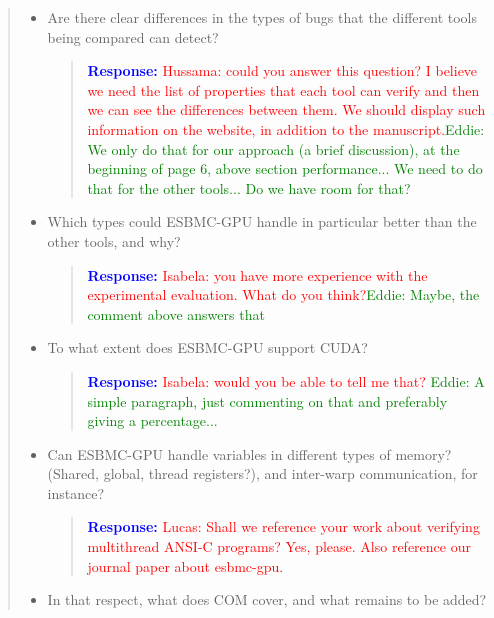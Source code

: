 \documentclass[11pt]{article}
\begin{document}
\begin{quote}
  \begin{itemize}
  \item Are there clear differences in the types of bugs that the different tools being compared can detect?
  
  \begin{quote}
  \textcolor{blue}{\textbf{Response:} \textcolor{red}{Hussama: could you answer this question? I believe we need the list of properties that each tool can verify and then we can see the differences between them. We should display such information on the website, in addition to the manuscript.}\textcolor{green}{Eddie: We only do that for our approach (a brief discussion), at the beginning of page 6, above section performance... We need to do that for the other tools... Do we have room for that?}}
  \end{quote}
  
  \item Which types could ESBMC-GPU handle in particular better than the other tools, and why?
  
  \begin{quote}
  \textcolor{blue}{\textbf{Response:} \textcolor{red}{Isabela: you have more experience with the experimental evaluation. What do you think?}\textcolor{green}{Eddie: Maybe, the comment above answers that}}
  \end{quote}
  
  \item To what extent does ESBMC-GPU support CUDA?
  
  \begin{quote}
  \textcolor{blue}{\textbf{Response:} \textcolor{red}{Isabela: would you be able to tell me that?} \textcolor{green}{Eddie: A simple paragraph, just commenting on that and preferably giving a percentage...}}
  \end{quote}
  
  \item Can ESBMC-GPU handle variables in different types of memory? (Shared, global, thread registers?), and inter-warp communication, for instance? 
  
  \begin{quote}
  \textcolor{blue}{\textbf{Response:} \textcolor{red}{Lucas: Shall we reference your work about verifying multithread ANSI-C programs? Yes, please. Also reference our journal paper about esbmc-gpu.}}
  \end{quote}
  
  \item In that respect, what does COM cover, and what remains to be added?
  

\end{itemize}
\end{quote}
\end{document}
